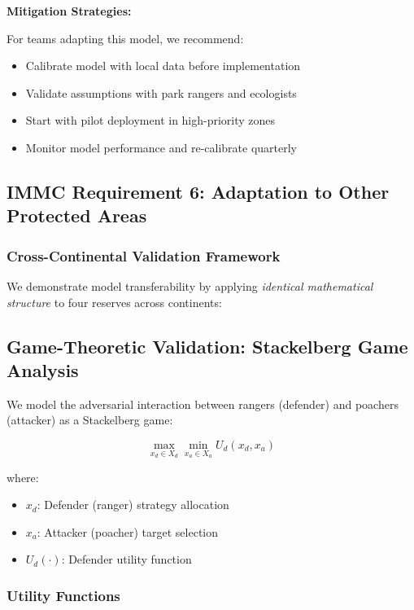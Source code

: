 \textbf{Mitigation Strategies:}

For teams adapting this model, we recommend:
\begin{itemize}
    \item Calibrate model with local data before implementation
    \item Validate assumptions with park rangers and ecologists
    \item Start with pilot deployment in high-priority zones
    \item Monitor model performance and re-calibrate quarterly
\end{itemize}

\subsection*{IMMC Requirement 6: Adaptation to Other Protected Areas}

\subsubsection{Cross-Continental Validation Framework}

We demonstrate model transferability by applying \textit{identical mathematical structure} to four reserves across continents:

\subsection{Game-Theoretic Validation: Stackelberg Game Analysis}

We model the adversarial interaction between rangers (defender) and poachers (attacker) as a Stackelberg game:

\begin{equation}
\max_{x_d \in X_d} \min_{x_a \in X_a} U_d(x_d, x_a)
\label{eq:stackelberg}
\end{equation}

where:
\begin{itemize}
    \item $x_d$: Defender (ranger) strategy allocation
    \item $x_a$: Attacker (poacher) target selection
    \item $U_d(\cdot)$: Defender utility function
\end{itemize}

\subsubsection{Utility Functions}

